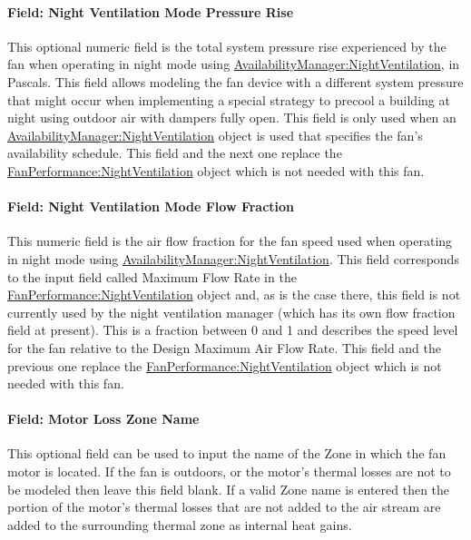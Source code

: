 \paragraph{Field: Night Ventilation Mode Pressure Rise}\label{field-nite-vent-pressure-fansysmodel}

This optional numeric field is the total system pressure rise experienced by the fan when operating in night mode using \hyperref[availabilitymanagernightventilation]{AvailabilityManager:NightVentilation}, in Pascals. This field allows modeling the fan device with a different system pressure that might occur when implementing a special strategy to precool a building at night using outdoor air with dampers fully open. This field is only used when an \hyperref[availabilitymanagernightventilation]{AvailabilityManager:NightVentilation} object is used that specifies the fan's availability schedule. This field and the next one replace the \hyperref[fanperformancenightventilation]{FanPerformance:NightVentilation} object which is not needed with this fan.

\paragraph{Field: Night Ventilation Mode Flow Fraction}\label{field-nite-vent-flow-fraction-fansysmodel}

This numeric field is the air flow fraction for the fan speed used when operating in night mode using \hyperref[availabilitymanagernightventilation]{AvailabilityManager:NightVentilation}. This field corresponds to the input field called Maximum Flow Rate in the \hyperref[fanperformancenightventilation]{FanPerformance:NightVentilation} object and, as is the case there, this field is not currently used by the night ventilation manager (which has its own flow fraction field at present). This is a fraction between 0 and 1 and describes the speed level for the fan relative to the Design Maximum Air Flow Rate. This field and the previous one replace the \hyperref[fanperformancenightventilation]{FanPerformance:NightVentilation} object which is not needed with this fan.

\paragraph{Field: Motor Loss Zone Name}\label{field-loss-zone-name-fansysmodel}

This optional field can be used to input the name of the Zone in which the fan motor is located.  If the fan is outdoors, or the motor's thermal losses are not to be modeled then leave this field blank.  If a valid Zone name is entered then the portion of the motor's thermal losses that are not added to the air stream are added to the surrounding thermal zone as internal heat gains.

